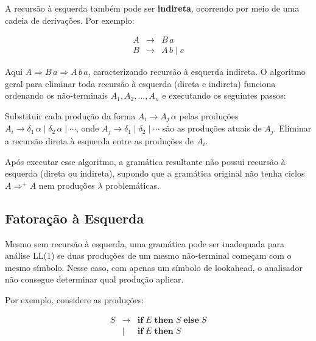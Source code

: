   A recursão à esquerda também pode ser \textbf{indireta}, ocorrendo
  por meio de uma cadeia de derivações. Por exemplo:

  \[
    \begin{array}{lcl}
      A & \to & B\,a\\
      B & \to & A\,b \mid c
    \end{array}
  \]

  Aqui \(A \Rightarrow B\,a \Rightarrow A\,b\,a\), caracterizando
  recursão à esquerda indireta. O algoritmo geral para eliminar toda
  recursão à esquerda (direta e indireta) funciona ordenando os
  não-terminais \(A_1, A_2, \ldots, A_n\) e executando os seguintes passos:

  \begin{algorithm}
    \caption{Eliminação de recursão à esquerda}
    \begin{algorithmic}[1]
      \State Substituir cada produção da forma $A_i \to A_j\,\alpha$
      pelas produções $A_i \to \delta_1\,\alpha \mid \delta_2\,\alpha
      \mid \cdots$,
      onde $A_j \to \delta_1 \mid \delta_2 \mid \cdots$ são as
      produções atuais de $A_j$.
      \EndFor
      \State Eliminar a recursão direta à esquerda entre as produções de $A_i$.
      \EndFor
    \end{algorithmic}
  \end{algorithm}

  Após executar esse algoritmo, a gramática resultante não possui
  recursão à esquerda (direta ou indireta), supondo que a gramática
  original não tenha ciclos \(A \Rightarrow^+ A\) nem produções
  \(\lambda\) problemáticas.

  \subsection{Fatoração à Esquerda}

  Mesmo sem recursão à esquerda, uma gramática pode ser inadequada para
  análise LL(1) se duas produções de um mesmo não-terminal começam com
  o mesmo símbolo. Nesse caso, com apenas um símbolo de lookahead, o
  analisador não consegue determinar qual produção aplicar.

  Por exemplo, considere as produções:

  \[
    \begin{array}{lcl}
      S & \to & \mathbf{if}\;E\;\mathbf{then}\;S\;\mathbf{else}\;S\\
      & \mid & \mathbf{if}\;E\;\mathbf{then}\;S
    \end{array}
  \]

